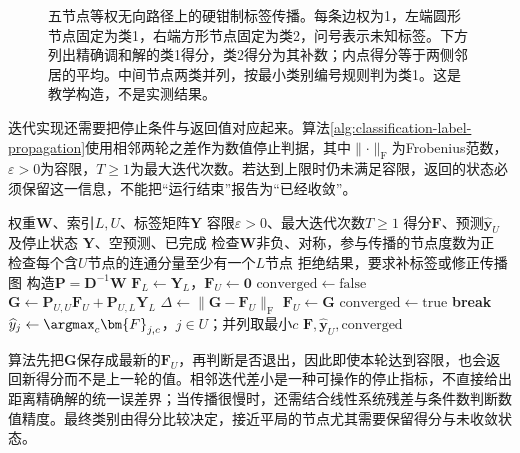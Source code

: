 \begin{figure}[htbp]
  \centering
  
  \caption{五节点等权无向路径上的硬钳制标签传播。每条边权为1，左端圆形节点固定为类1，右端方形节点固定为类2，问号表示未知标签。下方列出精确调和解的类1得分，类2得分为其补数；内点得分等于两侧邻居的平均。中间节点两类并列，按最小类别编号规则判为类1。这是教学构造，不是实测结果。}
  \label{fig:classification-label-propagation}
\end{figure}

迭代实现还需要把停止条件与返回值对应起来。算法\ref{alg:classification-label-propagation}使用相邻两轮之差作为数值停止判据，其中$\lVert\cdot\rVert_{\mathrm{F}}$为Frobenius范数，$\varepsilon>0$为容限，$T\geq1$为最大迭代次数。若达到上限时仍未满足容限，返回的状态必须保留这一信息，不能把“运行结束”报告为“已经收敛”。

\begin{algorithm}[硬钳制标签传播]
  \label{alg:classification-label-propagation}
  \begin{algorithmic}[1]
    \Require 权重$\bm{W}$、索引$L,U$、标签矩阵$\bm{Y}$
    \Require 容限$\varepsilon>0$、最大迭代次数$T\geq1$
    \Ensure 得分$\bm{F}$、预测$\widehat{\bm{y}}_U$及停止状态
      \State \Return $\bm{Y}$、空预测、已完成
    \EndIf
    \State 检查$\bm{W}$非负、对称，参与传播的节点度数为正
    \State 检查每个含$U$节点的连通分量至少有一个$L$节点
      \State \Return 拒绝结果，要求补标签或修正传播图
    \EndIf
    \State 构造$\bm{P}=\bm{D}^{-1}\bm{W}$
    \State $\bm{F}_L\gets\bm{Y}_L$，$\bm{F}_U\gets\bm{0}$
    \State $\mathrm{converged}\gets\mathrm{false}$
      \State $\bm{G}\gets\bm{P}_{U,U}\bm{F}_U+\bm{P}_{U,L}\bm{Y}_L$
      \State $\Delta\gets\lVert\bm{G}-\bm{F}_U\rVert_{\mathrm{F}}$
      \State $\bm{F}_U\gets\bm{G}$
        \State $\mathrm{converged}\gets\mathrm{true}$
        \State \textbf{break}
      \EndIf
    \EndFor
    \State $\widehat y_j\gets\argmax_c\bm{F}_{j,c}$，$j\in U$；并列取最小$c$
    \State \Return $\bm{F},\widehat{\bm{y}}_U,\mathrm{converged}$
  \end{algorithmic}
\end{algorithm}

算法先把$\bm{G}$保存成最新的$\bm{F}_U$，再判断是否退出，因此即使本轮达到容限，也会返回新得分而不是上一轮的值。相邻迭代差小是一种可操作的停止指标，不直接给出距离精确解的统一误差界；当传播很慢时，还需结合线性系统残差与条件数判断数值精度。最终类别由得分比较决定，接近平局的节点尤其需要保留得分与未收敛状态。


